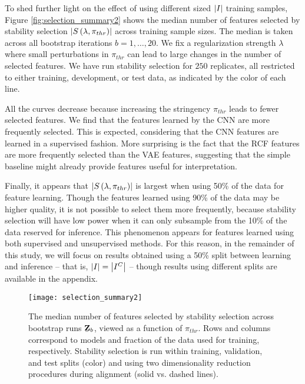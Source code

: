 To shed further light on the effect of using different sized $\left|I\right|$
training samples, Figure \ref{fig:selection_summary2} shows the median number of
features selected by stability selection $\left|S\left(\lambda,
  \pi_{thr}\right)\right|$ across training sample sizes. The median is taken across
all bootstrap iterations $b = 1, \dots, 20$. We fix a regularization strength
$\lambda$ where small perturbations in $\pi_{thr}$ can lead to large changes in
the number of selected features. We have run stability selection for $250$
replicates, all restricted to either training, development, or test data, as
indicated by the color of each line.

All the curves decrease because increasing the stringency $\pi_{thr}$ leads to
fewer selected features. We find that the features learned by the CNN are more
frequently selected. This is expected, considering that the CNN features are
learned in a supervised fashion. More surprising is the fact that the RCF
features are more frequently selected than the VAE features, suggesting that the
simple baseline might already provide features useful for interpretation.

Finally, it appears that $\left|S\left(\lambda, \pi_{thr}\right)\right|$ is largest
when using 50\% of the data for feature learning. Though the features learned
using 90\% of the data may be higher quality, it is not possible to select them
more frequently, because stability selection will have low power when it can
only subsample from the 10\% of the data reserved for inference. This phenomenon
appears for features learned using both supervised and unsupervised methods. For
this reason, in the remainder of this study, we will focus on results obtained
using a 50\% split between learning and inference -- that is, $\left|I\right| =
\left|I^{C}\right|$ -- though results using different splits are available in the
appendix.

\begin{figure}
  \centering
  \texttt{[image: selection\_summary2]}
  \caption{The median number of features selected by stability selection across
    bootstrap runs $\protect\underaccent{\bar}{\mathbf{Z}}_{b}$, viewed as a function of
    $\pi_{thr}$. Rows and columns correspond to models and fraction of the data
    used for training, respectively. Stability selection is run within training,
    validation, and test splits (color) and using two dimensionality reduction
    procedures during alignment (solid vs. dashed lines).}
  \label{fig:selection_summary}
\end{figure}

